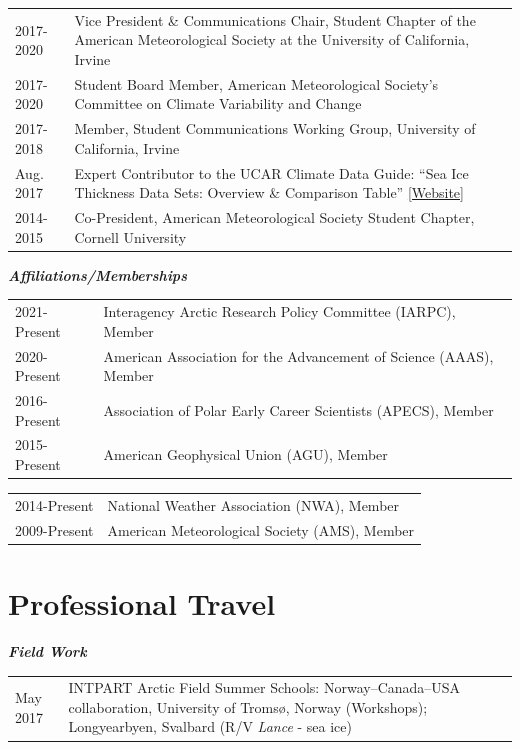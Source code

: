 \documentclass[margin,line,palatino,courier,10pt]{res}
\begin{document}
\begin{resume}
\begin{tabular}{@{}p{0.9in}p{4in}}
2017-2020 & Vice President \& Communications Chair, Student Chapter of the American Meteorological Society at the University of California, Irvine\\
2017-2020 & Student Board Member, American Meteorological Society's Committee on Climate Variability and Change\\
2017-2018 & Member, Student Communications Working Group, University of California, Irvine\\
Aug. 2017 & Expert Contributor to the UCAR Climate Data Guide: ``Sea Ice Thickness Data Sets: Overview \& Comparison Table'' \href{https://climatedataguide.ucar.edu/climate-data/sea-ice-thickness-data-sets-overview-comparison-table}{[Website]}\\
2014-2015 & Co-President, American Meteorological Society Student Chapter, Cornell University\\
\end{tabular}

\textit{\textbf{Affiliations/Memberships}}
\vspace*{0.05in}\\
\begin{tabular}{@{}p{0.9in}p{4in}}
2021-Present & Interagency Arctic Research Policy Committee (IARPC), Member\\
2020-Present & American Association for the Advancement of Science (AAAS), Member\\
2016-Present & Association of Polar Early Career Scientists (APECS), Member\\ 
2015-Present & American Geophysical Union (AGU), Member\\
\end{tabular}
\begin{tabular}{@{}p{0.9in}p{4in}}
2014-Present & National Weather Association (NWA), Member\\
2009-Present & American Meteorological Society (AMS), Member\\
\end{tabular}
\section{\sc \textcolor{Cerulean}{\large{\textbf{Professional Travel}}}}
\textit{\textbf{Field Work}}
\vspace*{0.05in}\\
\begin{tabular}{@{}p{0.9in}p{4in}}
May 2017 & INTPART Arctic Field Summer Schools: Norway--Canada--USA collaboration, University of Troms\o, Norway (Workshops); Longyearbyen, Svalbard (R/V \textit{Lance} - sea ice)
\end{tabular}


\end{resume}
\end{document}
